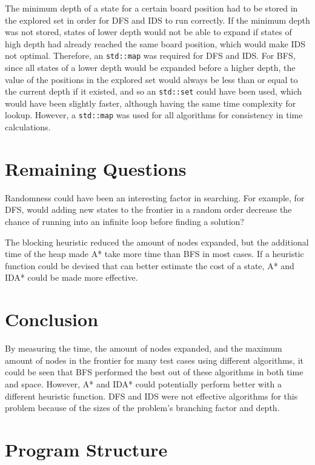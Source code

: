 \documentclass[12pt, a4paper]{article}
\begin{document}
The minimum depth of a state for a certain board position had to be stored in the explored set in order for DFS and IDS to run correctly. If the minimum depth was not stored, states of lower depth would not be able to expand if states of high depth had already reached the same board position, which would make IDS not optimal. Therefore, an {\tt std::map} was required for DFS and IDS. For BFS, since all states of a lower depth would be expanded before a higher depth, the value of the positions in the explored set would always be less than or equal to the current depth if it existed, and so an {\tt std::set} could have been used, which would have been slightly faster, although having the same time complexity for lookup. However, a {\tt std::map} was used for all algorithms for consistency in time calculations.

\section{Remaining Questions}

Randomness could have been an interesting factor in searching. For example, for DFS, would adding new states to the frontier in a random order decrease the chance of running into an infinite loop before finding a solution?

The blocking heuristic reduced the amount of nodes expanded, but the additional time of the heap made A* take more time than BFS in most cases. If a heuristic function could be devised that can better estimate the cost of a state, A* and IDA* could be made more effective.

\section{Conclusion}

By measuring the time, the amount of nodes expanded, and the maximum amount of nodes in the frontier for many test cases using different algorithms, it could be seen that BFS performed the best out of these algorithms in both time and space. However, A* and IDA* could potentially perform better with a different heuristic function. DFS and IDS were not effective algorithms for this problem because of the sizes of the problem's branching factor and depth.

\pagebreak

\appendix

\section{Program Structure}
\end{document}
